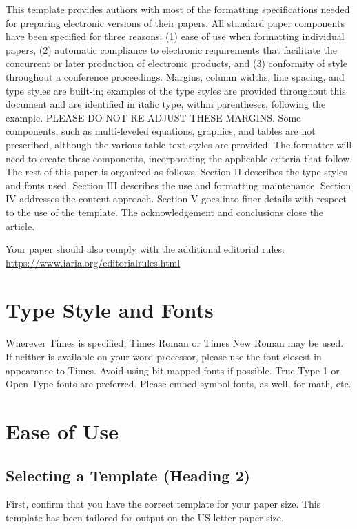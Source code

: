 \documentclass[conference,pbalance]{iaria}
\begin{document}
This template provides authors with most of the formatting specifications needed for preparing electronic versions of their papers. All standard paper components have been specified for three reasons: (1) ease of use when formatting individual papers, (2) automatic compliance to electronic requirements that facilitate the concurrent or later production of electronic products, and (3) conformity of style throughout a conference proceedings. Margins, column widths, line spacing, and type styles are built-in; examples of the type styles are provided throughout this document and are identified in italic type, within parentheses, following the example. PLEASE DO NOT RE-ADJUST THESE MARGINS. Some components, such as multi-leveled equations, graphics, and tables are not prescribed, although the various table text styles are provided. The formatter will need to create these components, incorporating the applicable criteria that follow. The rest of this paper is organized as follows. Section II describes the type styles and fonts used. Section III describes the use and formatting maintenance. Section IV addresses the content approach. Section V goes into finer details with respect to the use of the template.  The acknowledgement and conclusions close the article.

Your paper should also comply with the additional  editorial rules:
\url{https://www.iaria.org/editorialrules.html} \faWarning{}

\section{Type Style and Fonts}
Wherever Times is specified, Times Roman or Times New Roman may be used. If neither is available on your word processor, please use the font closest in appearance to Times. Avoid using bit-mapped fonts if possible. True-Type 1 or Open Type fonts are preferred. Please embed symbol fonts, as well, for math, etc.

\section{Ease of Use}

\subsection{Selecting a Template (Heading 2)}
First, confirm that you have the correct template for your paper size. This template has been tailored for output on the US-letter paper size.
\end{document}
